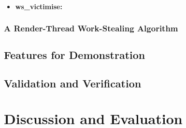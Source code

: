 \begin{itemize}
\item \textbf{ws\_victimise: } \\
                
                
\end{itemize}

\subsection{A Render-Thread Work-Stealing Algorithm}


\section{Features for Demonstration}


\section{Validation and Verification}

\chapter{Discussion and Evaluation}
